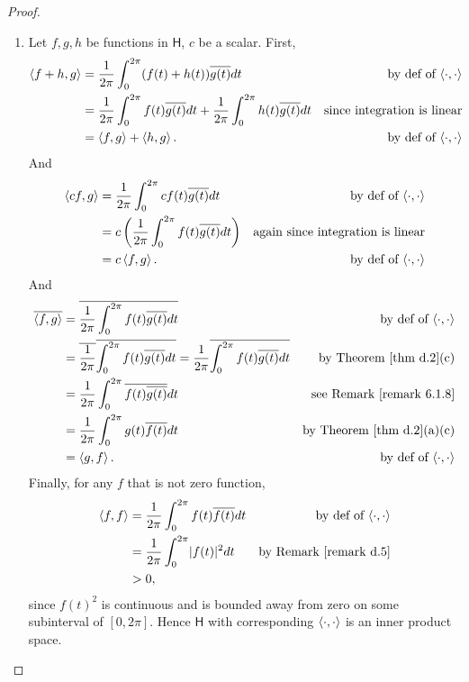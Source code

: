 \begin{proof} \ 

\begin{enumerate}
\item
Let \(f, g, h\) be functions in \(\textsf{H}\), \(c\) be a scalar.
First,
\begin{align*}
    \left< f + h, g \right> & = \frac{1}{2\pi} \int_{0}^{2\pi} (f(t) + h(t)) \overline{g(t)} d t & \text{by def of \(\left<\cdot, \cdot \right>\)} \\
    & = \frac{1}{2 \pi} \int_{0}^{2 \pi} f(t) \overline{g(t)} d t + \frac{1}{2 \pi} \int_{0}^{2 \pi} h(t) \overline{g(t)} d t & \text{since integration is linear} \\
    & = \left< f, g \right> + \left< h, g \right>. & \text{by def of \(\left<\cdot, \cdot \right>\)}
\end{align*}
And
\begin{align*}
    \left< c f, g \right> & = \frac{1}{2 \pi} \int_{0}^{2 \pi} c f(t) \overline{g(t)} d t & \text{by def of \(\left<\cdot, \cdot \right>\)} \\
    & = c\left(\frac{1}{2 \pi} \int_{0}^{2 \pi} f(t) \overline{g(t)} d t \right) & \text{again since integration is linear} \\
    & = c \left< f, g \right>. & \text{by def of \(\left<\cdot, \cdot \right>\)}
\end{align*}
And
\begin{align*}
    \conjugatet{\LG f, g \RG} & = \conjugatet{\frac{1}{2 \pi} \int_{0}^{2 \pi} f(t) \conjugatet{g(t)} d t} & \text{by def of \(\InnerOp\)} \\
        & = \conjugatet{\frac{1}{2 \pi}} \conjugatet{\int_{0}^{2 \pi} f(t) \conjugatet{g(t)} d t} = \frac{1}{2 \pi} \conjugatet{\int_{0}^{2 \pi} f(t) \conjugatet{g(t)} d t} & \text{by \THM{d.2}(c)} \\
        & = \frac{1}{2 \pi} \int_{0}^{2 \pi} \overline{f(t) \conjugatet{g(t)}} d t & \text{see \RMK{6.1.8}} \\
        & = \frac{1}{2 \pi} \int_{0}^{2 \pi} g(t) \conjugatet{f(t)} d t & \text{by \THM{d.2}(a)(c)} \\
        & = \LG g, f \RG. & \text{by def of \(\InnerOp\)}
\end{align*}
Finally, for any \(f\) that is not zero function,
\begin{align*}
    \LG f, f \RG & = \frac{1}{2 \pi} \int_{0}^{2 \pi} f(t) \conjugatet{f(t)} d t & \text{by def of \(\InnerOp\)} \\
        & = \frac{1}{2 \pi} \int_{0}^{2 \pi} \abs{f(t)}^2 d t & \text{by \RMK{d.5}} \\
        & > 0, &
\end{align*}
since \(f(t)^2\) is continuous and is bounded away from zero on some subinterval of \([0, 2\pi]\).
Hence \(\textsf{H}\) with corresponding \(\left< \cdot, \cdot \right>\) is an inner product space.


\end{enumerate}
\end{proof}

